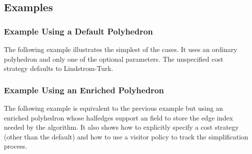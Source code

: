 \subsection{Examples}

\subsubsection{Example Using a Default Polyhedron}

The following example illustrates the simplest of the cases. It uses
an ordinary polyhedron and only one of the optional parameters.
The unspecified cost strategy defaults to Lindstrom-Turk.

\subsubsection{Example Using an Enriched Polyhedron}

The following example is equivalent to the previous example but using an
enriched polyhedron whose halfedges support an  field to
store the edge index needed by the algorithm. It also shows how to
explicitly specify a cost strategy (other than the default)
and how to use a visitor policy to track the simplification process.




